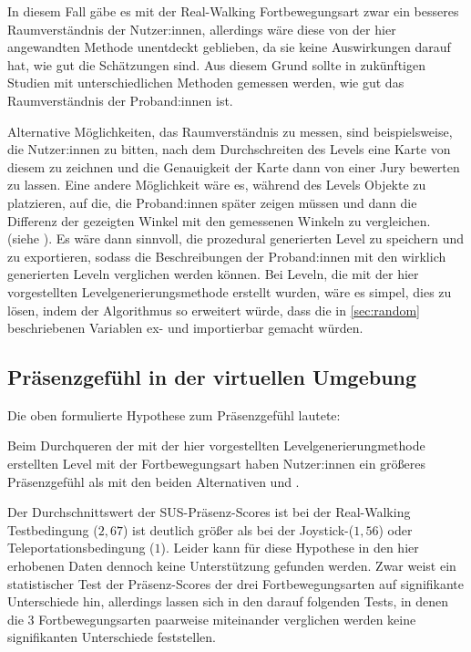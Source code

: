             In diesem Fall gäbe es mit der Real-Walking Fortbewegungsart zwar ein besseres Raumverständnis der Nutzer:innen, allerdings wäre diese von der hier angewandten Methode unentdeckt geblieben, da sie keine Auswirkungen darauf hat, wie gut die Schätzungen sind. Aus diesem Grund sollte in zukünftigen Studien mit unterschiedlichen Methoden gemessen werden, wie gut das Raumverständnis der Proband:innen ist.

            Alternative Möglichkeiten, das Raumverständnis zu messen, sind beispielsweise, die Nutzer:innen zu bitten, nach dem Durchschreiten des Levels eine Karte von diesem zu zeichnen und die Genauigkeit der Karte dann von einer Jury bewerten zu lassen. Eine andere Möglichkeit wäre es, während des Levels Objekte zu platzieren, auf die, die Proband:innen später zeigen müssen und dann die Differenz der gezeigten Winkel mit den gemessenen Winkeln zu vergleichen. (siehe \cite{peck-vergleich-2011, langbehn-vergleich-2018}). Es wäre dann sinnvoll, die prozedural generierten Level zu speichern und zu exportieren, sodass die Beschreibungen der Proband:innen mit den wirklich generierten Leveln verglichen werden können. Bei Leveln, die mit der hier vorgestellten Levelgenerierungsmethode erstellt wurden, wäre es simpel, dies zu lösen, indem der Algorithmus so erweitert würde, dass die in \autoref{sec:random} beschriebenen Variablen ex- und importierbar gemacht würden.

        \subsection{Präsenzgefühl in der virtuellen Umgebung}
            Die oben formulierte Hypothese zum Präsenzgefühl lautete:

            Beim Durchqueren der mit der hier vorgestellten Levelgenerierungmethode erstellten Level mit der  Fortbewegungsart haben Nutzer:innen ein größeres Präsenzgefühl als mit den beiden Alternativen  und .

            Der Durchschnittswert der SUS-Präsenz-Scores ist bei der Real-Walking Testbedingung ($2,67$) ist deutlich größer als bei der Joystick-($1,56$) oder Teleportationsbedingung ($1$).
            Leider kann für diese Hypothese in den hier erhobenen Daten dennoch keine Unterstützung gefunden werden. Zwar weist ein statistischer Test der Präsenz-Scores der drei Fortbewegungsarten auf signifikante Unterschiede hin, allerdings lassen sich in den darauf folgenden Tests, in denen die 3 Fortbewegungsarten paarweise miteinander verglichen werden keine signifikanten Unterschiede feststellen.

